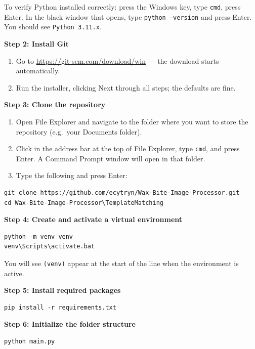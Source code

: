 \documentclass[11pt, letterpaper]{article}
\begin{document}
\begin{tipbox}
To verify Python installed correctly: press the Windows key, type \texttt{cmd}, press
Enter. In the black window that opens, type \texttt{python --version} and press Enter.
You should see \texttt{Python 3.11.x}.
\end{tipbox}

\textbf{Step 2: Install Git}

\begin{enumerate}
  \item Go to \url{https://git-scm.com/download/win} --- the download starts automatically.
  \item Run the installer, clicking Next through all steps; the defaults are fine.
\end{enumerate}

\textbf{Step 3: Clone the repository}

\begin{enumerate}
  \item Open File Explorer and navigate to the folder where you want to store the
        repository (e.g.\ your Documents folder).
  \item Click in the address bar at the top of File Explorer, type \texttt{cmd}, and
        press Enter. A Command Prompt window will open in that folder.
  \item Type the following and press Enter:
\end{enumerate}

\begin{lstlisting}
git clone https://github.com/ecytryn/Wax-Bite-Image-Processor.git
cd Wax-Bite-Image-Processor\TemplateMatching
\end{lstlisting}

\textbf{Step 4: Create and activate a virtual environment}

\begin{lstlisting}
python -m venv venv
venv\Scripts\activate.bat
\end{lstlisting}

You will see \texttt{(venv)} appear at the start of the line when the environment is active.

\textbf{Step 5: Install required packages}

\begin{lstlisting}
pip install -r requirements.txt
\end{lstlisting}

\textbf{Step 6: Initialize the folder structure}

\begin{lstlisting}
python main.py
\end{lstlisting}
\end{document}
